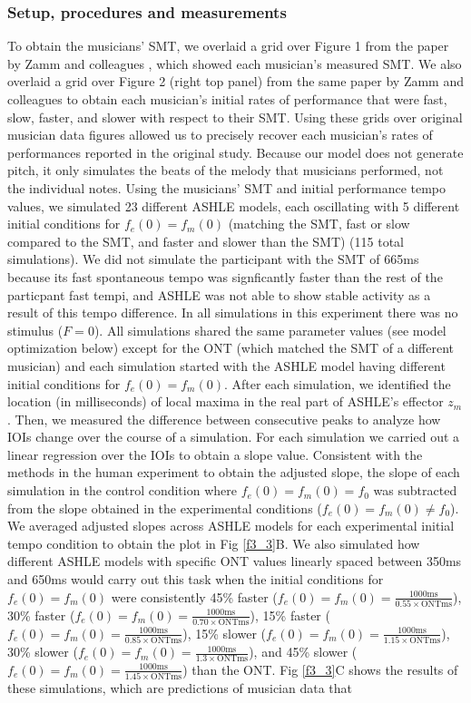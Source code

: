 \documentclass{report}
\begin{document}
\subsubsection{Setup, procedures and measurements}

To obtain the musicians' SMT, we overlaid a grid over Figure 1 from the paper by Zamm and colleagues \cite{zamm2018musicians}, which showed each musician's measured SMT. We also overlaid a grid over Figure 2 (right top panel) from the same paper by Zamm and colleagues to obtain each musician's initial rates of performance that were fast, slow, faster, and slower with respect to their SMT. Using these grids over original musician data figures allowed us to precisely recover each musician's rates of performances reported in the original study. Because our model does not generate pitch, it only simulates the beats of the melody that musicians performed, not the individual notes. Using the musicians' SMT and initial performance tempo values, we simulated 23 different ASHLE models, each oscillating with 5 different initial conditions for $f_e(0)=f_m(0)$ (matching the SMT, fast or slow compared to the SMT, and faster and slower than the SMT) (115 total simulations). We did not simulate the participant with the SMT of 665ms because its fast spontaneous tempo was signficantly faster than the rest of the particpant fast tempi, and ASHLE was not able to show stable activity as a result of this tempo difference. In all simulations in this experiment there was no stimulus ($F = 0$). All simulations shared the same parameter values (see model optimization below) except for the ONT (which matched the SMT of a different musician) and each simulation started with the ASHLE model having different initial conditions for $f_e(0)=f_m(0)$. After each simulation, we identified the location (in milliseconds) of local maxima in the real part of ASHLE's effector $z_m$. Then, we measured the difference between consecutive peaks to analyze how IOIs change over the course of a simulation. For each simulation we carried out a linear regression over the IOIs to obtain a slope value. Consistent with the methods in the human experiment to obtain the adjusted slope, the slope of each simulation in the control condition where $f_e(0)=f_m(0)=f_0$ was subtracted from the slope obtained in the experimental conditions ($f_e(0)=f_m(0)\neq f_0$). We averaged adjusted slopes across ASHLE models for each experimental initial tempo condition to obtain the plot in Fig \ref{f3_3}B. We also simulated how different ASHLE models with specific ONT values linearly spaced between 350ms and 650ms would carry out this task when the initial conditions for $f_e(0)=f_m(0)$ were consistently 45\% faster ($f_e(0)=f_m(0)=\frac{1000\text{ms}}{0.55 \times \text{ONTms}}$), 30\% faster ($f_e(0)=f_m(0)=\frac{1000\text{ms}}{0.70 \times \text{ONTms}}$), 15\% faster ($f_e(0)=f_m(0)=\frac{1000\text{ms}}{0.85 \times \text{ONTms}}$), 15\% slower ($f_e(0)=f_m(0)=\frac{1000\text{ms}}{1.15 \times \text{ONTms}}$), 30\% slower ($f_e(0)=f_m(0)=\frac{1000\text{ms}}{1.3 \times \text{ONTms}}$), and 45\% slower ($f_e(0)=f_m(0)=\frac{1000\text{ms}}{1.45 \times \text{ONTms}}$) than the ONT. Fig \ref{f3_3}C shows the results of these simulations, which are predictions of musician data that 
\end{document}
